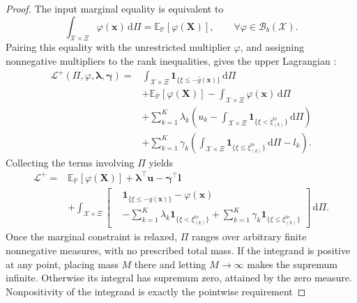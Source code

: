 \begin{proof}
  The input marginal equality is equivalent to
  \[
    \int_{\mathcal X\times\Xi}\varphi(\bm x)\,\mathrm d\Pi
    =\mathbb E_{\mathbb P}\left[\varphi(\bm X)\right],
    \qquad\forall\varphi\in\mathcal B_b(\mathcal X).
  \]
  Pairing this equality with the unrestricted multiplier $\varphi$, and assigning nonnegative multipliers to the rank inequalities, gives the upper Lagrangian \citep[Section~5.1]{B.V04}:
  \begin{equation}
    \begin{aligned}
      \mathcal L^+\left(\Pi,\varphi,\bm\lambda,\bm\gamma\right)
      ={}&\int_{\mathcal X\times\Xi}
        \mathbf1_{\{\xi\le-\hat g(\bm x)\}}\,\mathrm d\Pi\\
      &+\mathbb E_{\mathbb P}\left[\varphi(\bm X)\right]
        -\int_{\mathcal X\times\Xi}\varphi(\bm x)\,\mathrm d\Pi\\
      &+\sum_{k=1}^K\lambda_k\left(
        u_k-\int_{\mathcal X\times\Xi}
        \mathbf1_{\{\xi<\xi_{(k)}^{\mathrm{te}}\}}\,\mathrm d\Pi\right)\\
      &+\sum_{k=1}^K\gamma_k\left(
        \int_{\mathcal X\times\Xi}
        \mathbf1_{\{\xi\le\xi_{(k)}^{\mathrm{te}}\}}\,\mathrm d\Pi-l_k\right).
    \end{aligned}
    \label{eq-upper-lagrangian-expanded}
  \end{equation}
  Collecting the terms involving $\Pi$ yields
  \begin{equation}
    \begin{aligned}
      \mathcal L^+={}&\mathbb E_{\mathbb P}\left[\varphi(\bm X)\right]
        +\bm\lambda^\top\bm u-\bm\gamma^\top\bm l\\
      &+\int_{\mathcal X\times\Xi}\left[
        \begin{aligned}
          &\mathbf1_{\{\xi\le-\hat g(\bm x)\}}-\varphi(\bm x)\\
          &-\sum_{k=1}^K\lambda_k\mathbf1_{\{\xi<\xi_{(k)}^{\mathrm{te}}\}}
          +\sum_{k=1}^K\gamma_k\mathbf1_{\{\xi\le\xi_{(k)}^{\mathrm{te}}\}}
        \end{aligned}\right]\,\mathrm d\Pi.
    \end{aligned}
    \label{eq-upper-lagrangian}
  \end{equation}
  Once the marginal constraint is relaxed, $\Pi$ ranges over arbitrary finite nonnegative measures, with no prescribed total mass. If the integrand is positive at any point, placing mass $M$ there and letting $M\to\infty$ makes the supremum infinite. Otherwise its integral has supremum zero, attained by the zero measure. Nonpositivity of the integrand is exactly the pointwise requirement

\end{proof}
